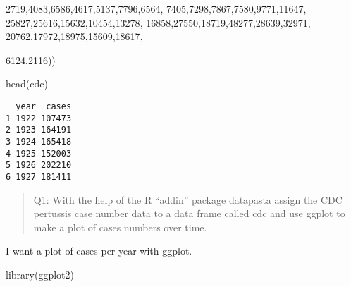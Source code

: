 \documentclass[
  letterpaper,
  DIV=11,
  numbers=noendperiod]{scrartcl}
\newenvironment{Shaded}{\begin{snugshade}}{\end{snugshade}}
\newcommand{\DecValTok}[1]{\textcolor[rgb]{0.68,0.00,0.00}{#1}}
\newcommand{\FunctionTok}[1]{\textcolor[rgb]{0.28,0.35,0.67}{#1}}
\newcommand{\NormalTok}[1]{\textcolor[rgb]{0.00,0.23,0.31}{#1}}
\begin{document}
\begin{Shaded}
\begin{Highlighting}[]
                                          \DecValTok{2719}\NormalTok{,}\DecValTok{4083}\NormalTok{,}\DecValTok{6586}\NormalTok{,}\DecValTok{4617}\NormalTok{,}\DecValTok{5137}\NormalTok{,}\DecValTok{7796}\NormalTok{,}\DecValTok{6564}\NormalTok{,}
                                          \DecValTok{7405}\NormalTok{,}\DecValTok{7298}\NormalTok{,}\DecValTok{7867}\NormalTok{,}\DecValTok{7580}\NormalTok{,}\DecValTok{9771}\NormalTok{,}\DecValTok{11647}\NormalTok{,}
                                          \DecValTok{25827}\NormalTok{,}\DecValTok{25616}\NormalTok{,}\DecValTok{15632}\NormalTok{,}\DecValTok{10454}\NormalTok{,}\DecValTok{13278}\NormalTok{,}
                                          \DecValTok{16858}\NormalTok{,}\DecValTok{27550}\NormalTok{,}\DecValTok{18719}\NormalTok{,}\DecValTok{48277}\NormalTok{,}\DecValTok{28639}\NormalTok{,}\DecValTok{32971}\NormalTok{,}
                                          \DecValTok{20762}\NormalTok{,}\DecValTok{17972}\NormalTok{,}\DecValTok{18975}\NormalTok{,}\DecValTok{15609}\NormalTok{,}\DecValTok{18617}\NormalTok{,}

\DecValTok{6124}\NormalTok{,}\DecValTok{2116}\NormalTok{))}
\end{Highlighting}
\end{Shaded}

\begin{Shaded}
\begin{Highlighting}[]
\FunctionTok{head}\NormalTok{(cdc)}
\end{Highlighting}
\end{Shaded}

\begin{verbatim}
  year  cases
1 1922 107473
2 1923 164191
3 1924 165418
4 1925 152003
5 1926 202210
6 1927 181411
\end{verbatim}

\begin{quote}
Q1: With the help of the R ``addin'' package datapasta assign the CDC
pertussis case number data to a data frame called cdc and use ggplot to
make a plot of cases numbers over time.
\end{quote}

I want a plot of cases per year with ggplot.

\begin{Shaded}
\begin{Highlighting}[]
\FunctionTok{library}\NormalTok{(ggplot2)}
\end{Highlighting}
\end{Shaded}
\end{document}

